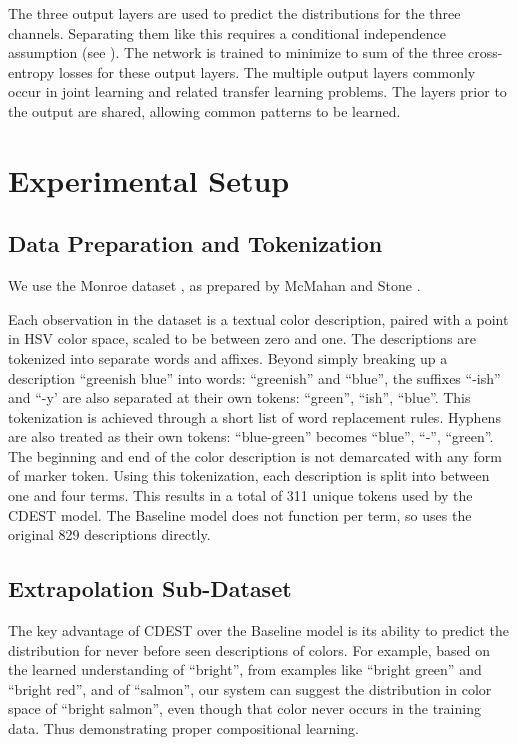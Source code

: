 \documentclass[11pt,letterpaper]{article}
\newcommand{\parencite}{\cite}
\begin{document}
The three output layers are used to predict the distributions for the three channels.
Separating them like this requires a conditional independence assumption (see ).
The network is trained to minimize to sum of the three cross-entropy losses for these output layers.
The multiple output layers commonly occur in joint learning and related transfer learning problems.
The layers prior to the output are shared, allowing common patterns to be learned.



\section{Experimental Setup}\label{sec:experimental-setup}
\subsection{Data Preparation and Tokenization}\label{sec:data-preparation}
We use the Monroe dataset \parencite{Monroe2010XKCDdataset}, as prepared by McMahan and Stone \parencite{mcmahan2015bayesian}.

Each observation in the dataset is a textual color description, paired with a point in HSV color space, scaled to be between zero and one.
The descriptions are tokenized into separate words and affixes.
Beyond simply breaking up a description ``greenish blue'' into words: ``greenish'' and ``blue'', the suffixes ``-ish'' and ``-y' are also separated at their own tokens: ``green'', ``ish'', ``blue''.
This tokenization is achieved through a short list of word replacement rules.
Hyphens are also treated as their own tokens: ``blue-green'' becomes ``blue'', ``-'', ``green''.
The beginning and end of the color description is not demarcated with any form of marker token.
Using this tokenization, each description is split into between one and four terms.
This results in a total of 311 unique tokens used by the CDEST model.
The Baseline model does not function per term, so uses the original 829 descriptions directly.


\subsection{Extrapolation Sub-Dataset}
The key advantage of CDEST over the Baseline model is its ability to predict the distribution for never before seen descriptions of colors.
For example, based on the learned understanding of ``bright'', from examples like ``bright green'' and ``bright red'', and of ``salmon'', our system can suggest the distribution in color space of ``bright salmon'', even though that color never occurs in the training data.
Thus demonstrating proper compositional learning.
\end{document}

